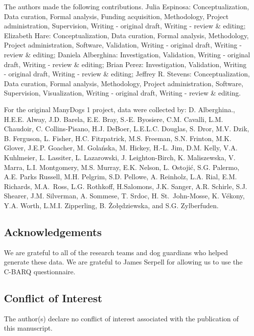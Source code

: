 \documentclass[
  pub,floatsintext]{apa6}
\begin{document}
The authors made the following contributions. Julia Espinosa: Conceptualization, Data curation, Formal analysis, Funding acquisition, Methodology, Project administration, Supervision, Writing - original draft, Writing - review \& editing; Elizabeth Hare: Conceptualization, Data curation, Formal analysis, Methodology, Project administration, Software, Validation, Writing - original draft, Writing - review \& editing; Daniela Alberghina: Investigation, Validation, Writing - original draft, Writing - review \& editing; Brian Perez: Investigation, Validation, Writing - original draft, Writing - review \& editing; Jeffrey R. Stevens: Conceptualization, Data curation, Formal analysis, Methodology, Project administration, Software, Supervision, Visualization, Writing - original draft, Writing - review \& editing.

For the original ManyDogs 1 project, data were collected by: D. Alberghina., H.E.E. Alway, J.D. Barela, E.E. Bray, S.-E. Byosiere, C.M. Cavalli, L.M. Chaudoir, C. Collins-Pisano, H.J. DeBoer, L.E.L.C. Douglas, S. Dror, M.V. Dzik, B. Ferguson, L. Fisher, H.C. Fitzpatrick, M.S. Freeman, S.N. Frinton, M.K. Glover, J.E.P. Goacher, M. Golańska, M.
Hickey, H.-L. Jim, D.M. Kelly, V.A. Kuhlmeier, L. Lassiter, L. Lazarowski, J. Leighton-Birch, K. Maliszewska, V. Marra, L.I. Montgomery, M.S. Murray, E.K. Nelson, L. Ostojić, S.G. Palermo, A.E. Parks Russell, M.H. Pelgrim, S.D. Pellowe, A. Reinholz, L.A. Rial, E.M. Richards, M.A.~Ross, L.G. Rothkoff, H.Salomons, J.K. Sanger, A.R. Schirle, S.J. Shearer, J.M. Silverman, A. Sommese, T. Srdoc, H. St.~John-Mosse, K. Vékony, Y.A. Worth, L.M.I. Zipperling, B. Żołędziewska, and S.G. Zylberfuden.

\hypertarget{acknowledgements}{%
\subsection{Acknowledgements}\label{acknowledgements}}

We are grateful to all of the research teams and dog guardians who helped generate these data. We are grateful to James Serpell for allowing us to use the C-BARQ questionnaire.

\hypertarget{conflict-of-interest}{%
\subsection{Conflict of Interest}\label{conflict-of-interest}}

The author(s) declare no conflict of interest associated with the publication of this manuscript.
\end{document}
